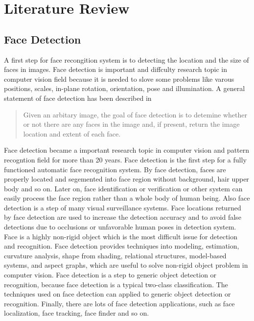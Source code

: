 \chapter{Literature Review}
\label{ch:review}
\section{Face Detection}
A first step for face recongition system is to detecting the location and the size of faces in images. Face detection is important and diffculty research topic in computer vision field because it is needed to slove some problems like varous positions, scales, in-plane rotation, orientation, pose and illumination. A general statement of face detection has been described in \cite{Ming2000}
\begin{quote}
Given an arbitary image, the goal of face detection is to detemine whether or not there are any faces in the image and, if present, return the image location and extent of each face.
\end{quote}

Face detection became a important research topic in computer vision and pattern recogntion field for more than 20 years. Face detection is the first step for a fully functioned automatic face recognition system. By face detection, faces are properly located and segemented into face region without background, hair upper body and so on. Later on, face identification or verification or other system can easily process the face region rather than a whole body of human being. Also face detection is a step of many visual surveillance systems\cite{Foresti2003}. Face locations returned by face detection are used to increase the detection accuracy and to avoid false detections due to occlusions or unfavorable human poses in detection system.  Face is a highly non-rigid object which is the most difficult issue for detection and recognition. Face detection provides techniques into modeling, estimation, curvature analysis, shape from shading, relational structures, model-based systems, and aspect graphs, which are useful to solve  non-rigid object problem in computer vision. Face detection is a step to generic object detection or recognition, because face detection is a typical two-class classification. The techniques used on face detection can applied to generic object detection or recognition. Finally, there are lots of face detection applications, such as face localization, face tracking, face finder and so on.

